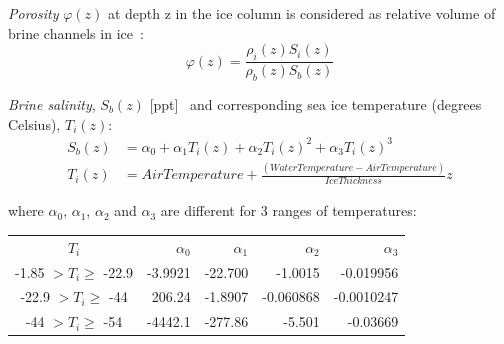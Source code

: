 \documentclass[gmd, manuscript]{copernicus}
\begin{document}





\appendix
\section{}    %
\label{app:A}

\emph{Porosity} $\varphi(z)$ at depth \unit{z} in the ice column is considered as relative volume of brine channels in ice~\citep{Arrigo1993}:
\begin{equation}
    \varphi(z) =
    \frac{\rho_{i}(z) S_{i}(z)}{\rho_{b}(z) S_{b}(z)}
\end{equation}

\emph{Brine salinity}, $S_{b}(z)$ [\unit{ppt}]~\citep{Arrigo1993} and corresponding sea ice temperature (degrees Celsius), $T_{i}(z)$:
\begin{align}
    S_{b}(z) &= \alpha_{0} + \alpha_{1} T_{i}(z)
             + \alpha_{2} T_{i}(z)^{2}
             + \alpha_{3} T_{i}(z)^{3} \\
    T_{i}(z) &= AirTemperature + \frac
               {(WaterTemperature - AirTemperature)}
               {IceThickness} z
\end{align}

where $\alpha_{0}$, $\alpha_{1}$, $\alpha_{2}$ and $\alpha_{3}$ are different for 3 ranges of temperatures:

\begin{tabular}{crrrr}
    $T_{i}$ & $\alpha_{0}$ & $\alpha_{1}$ & $\alpha_{2}$ & $\alpha_{3}$ \\
    -1.85 $ > T_{i} \ge $ -22.9 & -3.9921 & -22.700 & -1.0015   & -0.019956 \\
    -22.9 $ > T_{i} \ge $ -44   & 206.24  & -1.8907 & -0.060868 & -0.0010247 \\
    -44 $ > T_{i} \ge $ -54     & -4442.1 & -277.86 & -5.501    & -0.03669
\end{tabular}
\newline
\end{document}
